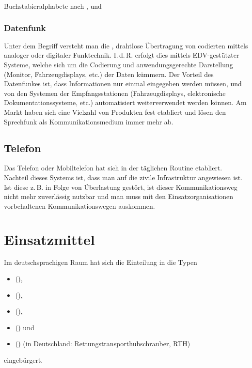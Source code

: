{Buchstabieralphabete nach , 
und }
{}








\subsubsection{Datenfunk}

Unter dem Begriff  versteht man die
, drahtlose Übertragung von codierten
 mittels analoger oder digitaler Funktechnik.
I.\,d.\,R. erfolgt dies mittels EDV-gestützter Systeme,
welche sich um die Codierung und anwendungsgerechte
Darstellung (Monitor, Fahrzeugdisplays, etc.) der Daten
kümmern. Der Vorteil des Datenfunkes ist, dass Informationen
nur einmal eingegeben werden müssen, und von den Systemen
der Empfangsstationen (Fahrzeugdisplays, elektronische
Dokumentationssysteme, etc.) automatisiert weiterverwendet
werden können. Am Markt haben sich eine Vielzahl von
Produkten fest etabliert und lösen den Sprechfunk als
Kommunikationsmedium immer mehr ab.


\subsection{Telefon}
%

Das Telefon oder Mobiltelefon hat sich in der täglichen
Routine etabliert. Nachteil dieses Systems ist, dass man auf
die zivile Infrastruktur angewiesen ist. Ist diese z.\,B.
in Folge von Überlastung gestört, ist dieser
Kommunikationsweg nicht mehr zuverlässig nutzbar und man
muss mit den Einsatzorganisationen vorbehaltenen
Kommunikationswegen auskommen.


\clearpage
\section{Einsatzmittel}
\label{topic:einsatzmittel}

Im deutschsprachigen Raum hat sich die Einteilung in die
Typen 

\begin{itemize}
  \item {} (), 
  \item {}
(), 
\item {} (), 
\item {}
() und 
\item {} () (in Deutschland:
Rettungstransporthubschrauber, RTH) 
\end{itemize}
eingebürgert.

